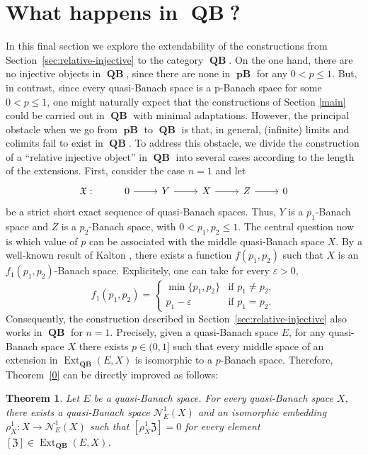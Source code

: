 \documentclass[12pt,a4paper]{amsproc}
\newtheorem{thm}{Theorem}[section]
\theoremstyle{remark}
\theoremstyle{definition}
\newcommand{\Ext}{\operatorname{Ext}}
\newcommand{\QBan}{\operatorname{\textbf{QB}}}
\newcommand{\pBan}{\operatorname{\textbf{pB}}}
\numberwithin{equation}{section}
\begin{document}
\section{What happens in $\QBan$?}\label{sec:QBan}
\par In this final section we explore the extendability of the constructions from Section~\ref{sec:relative-injective} to the category $\QBan$. On the one hand, there are no injective objects in $\QBan$, since there are none in $\pBan$ for any $0<p \leq 1$. But, in contrast, since every quasi-Banach space is a p-Banach space for some $0<p \leq 1$, one might naturally expect that the constructions of Section \ref{main} could be carried out in $\QBan$ with minimal adaptations. However, the principal obstacle when we go from $\pBan$ to $\QBan$ is that, in general, (infinite) limits and colimits fail to exist in $\QBan$. To address this obstacle, we divide the construction of a ``relative injective object'' in $\QBan$ into several cases according to the length of the extensions. First, consider the case $n=1$ and let
\[ 
\begin{tikzcd}
    \mathfrak{X}: & 0 \arrow[r] & Y \arrow[r] & X \arrow[r] & Z \arrow[r] & 0 
\end{tikzcd}
\]
be a strict short exact sequence of quasi-Banach spaces. Thus, $Y$ is a $p_1$-Banach space and $Z$ is a $p_2$-Banach space, with $0 < p_1, p_2 \le 1$. The central question now is which value of $p$ can be associated with the middle quasi-Banach space $X$.
By a well-known result of Kalton \cite{Kalton}, there exists a function $f(p_1,p_2)$ such that $X$ is an $f_1(p_1,p_2)$-Banach space. Explicitely, one can take for every $\varepsilon>0$, 
\[ 
f_1(p_1,p_2) = \begin{cases} 
\min\{p_1,p_2\} & \text{if } p_1 \neq p_2, \\ 
p_1 - \varepsilon & \text{if } p_1 = p_2. 
\end{cases} 
\]
Consequently, the construction described in Section~\ref{sec:relative-injective} also works in $\QBan$ for $n=1$. Precisely, given a quasi-Banach space $E$, for any quasi-Banach space $X$ there exists $p \in (0,1]$ such that every middle space of an extension in $\Ext_{\QBan}(E,X)$ is isomorphic to a $p$-Banach space. Therefore, Theorem~\ref{0} can be directly improved as follows:

\begin{thm}
Let $E$ be a quasi-Banach space. For every quasi-Banach space $X$, there exists a quasi-Banach space $\mathcal{N}_E^1(X)$ and an isomorphic embedding $\rho^1_X: X \to \mathcal{N}_E^1(X)$ such that $[\rho_X^1 \mathfrak{Z}] = 0$ for every element $[\mathfrak{Z}] \in \Ext_{\QBan}(E,X)$.
\end{thm}
\end{document}
